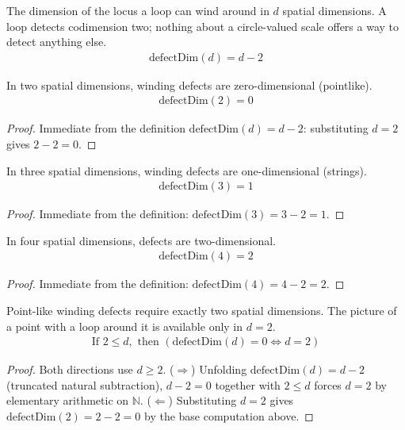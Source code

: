 \begin{definition}
The dimension of the locus a loop can wind around in $d$ spatial dimensions.  A loop detects codimension two; nothing about a circle-valued scale offers a way to detect anything else.
\begin{align*}
\text{defectDim}(d) = d - 2
\end{align*}
\end{definition}

\begin{proposition}
In two spatial dimensions, winding defects are zero-dimensional (pointlike).
\begin{align*}
\text{defectDim}(2) = 0
\end{align*}
\begin{proof}
Immediate from the definition $\text{defectDim}(d)=d-2$: substituting $d=2$ gives $2-2=0$.
\end{proof}
\end{proposition}

\begin{proposition}
In three spatial dimensions, winding defects are one-dimensional (strings).
\begin{align*}
\text{defectDim}(3) = 1
\end{align*}
\begin{proof}
Immediate from the definition: $\text{defectDim}(3) = 3-2 = 1$.
\end{proof}
\end{proposition}

\begin{proposition}
In four spatial dimensions, defects are two-dimensional.
\begin{align*}
\text{defectDim}(4) = 2
\end{align*}
\begin{proof}
Immediate from the definition: $\text{defectDim}(4) = 4-2 = 2$.
\end{proof}
\end{proposition}

\begin{theorem}
Point-like winding defects require exactly two spatial dimensions.  The picture of a point with a loop around it is available only in $d = 2$.
\begin{align*}
\text{If } 2 \le d, \text{ then } (\text{defectDim}(d) = 0 \Leftrightarrow d = 2)
\end{align*}
\begin{proof}
Both directions use $d\geq2$. ($\Rightarrow$) Unfolding $\text{defectDim}(d)=d-2$ (truncated natural subtraction), $d-2=0$ together with $2\leq d$ forces $d=2$ by elementary arithmetic on $\mathbb{N}$. ($\Leftarrow$) Substituting $d=2$ gives $\text{defectDim}(2)=2-2=0$ by the base computation above.
\end{proof}
\end{theorem}


